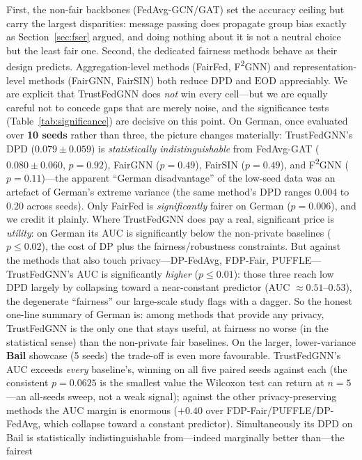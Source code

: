 \documentclass[pdflatex,sn-mathphys-num]{sn-jnl}
\theoremstyle{thmstyleone}%
\theoremstyle{thmstyletwo}%
\theoremstyle{thmstylethree}%
\newcommand{\dpd}{\mathrm{DPD}}
\newcommand{\eod}{\mathrm{EOD}}
\begin{document}
First, the non-fair backbones (FedAvg-GCN/GAT) set the accuracy ceiling but
carry the largest disparities: message passing does propagate group bias exactly
as Section~\ref{sec:fser} argued, and doing nothing about it is not a neutral
choice but the least fair one. Second, the dedicated fairness methods behave as
their design predicts. Aggregation-level methods (FairFed, F\textsuperscript{2}GNN)
and representation-level methods (FairGNN, FairSIN) both reduce $\dpd$ and
$\eod$ appreciably. We are explicit that TrustFedGNN does \emph{not} win every
cell---but we are equally careful not to concede gaps that are merely noise, and
the significance tests (Table~\ref{tab:significance}) are decisive on this point.
On German, once evaluated over \textbf{10 seeds} rather than three, the picture
changes materially: TrustFedGNN's DPD ($0.079\!\pm\!0.059$) is
\emph{statistically indistinguishable} from FedAvg-GAT ($0.080\!\pm\!0.060$,
$p{=}0.92$), FairGNN ($p{=}0.49$), FairSIN ($p{=}0.49$), and F\textsuperscript{2}GNN
($p{=}0.11$)---the apparent ``German disadvantage'' of the low-seed data was an
artefact of German's extreme variance (the same method's DPD ranges $0.004$ to
$0.20$ across seeds). Only FairFed is \emph{significantly} fairer on German
($p{=}0.006$), and we credit it plainly. Where TrustFedGNN does pay a real,
significant price is \emph{utility}: on German its AUC is significantly below the
non-private baselines ($p{\le}0.02$), the cost of DP plus the fairness/robustness
constraints. But against the methods that also touch privacy---DP-FedAvg,
FDP-Fair, PUFFLE---TrustFedGNN's AUC is significantly \emph{higher} ($p{\le}0.01$):
those three reach low DPD largely by collapsing toward a near-constant predictor
(AUC $\approx 0.51$--$0.53$), the degenerate ``fairness'' our large-scale study
flags with a dagger. So the honest one-line summary of German is: among methods
that provide any privacy, TrustFedGNN is the only one that stays useful, at
fairness no worse (in the statistical sense) than the non-private fair baselines.
On the larger, lower-variance \textbf{Bail} showcase (5 seeds) the trade-off is
even more favourable. TrustFedGNN's AUC exceeds \emph{every} baseline's, winning
on all five paired seeds against each (the consistent $p{=}0.0625$ is the
smallest value the Wilcoxon test can return at $n{=}5$---an all-seeds sweep, not
a weak signal); against the other privacy-preserving methods the AUC margin is
enormous ($+0.40$ over FDP-Fair/PUFFLE/DP-FedAvg, which collapse toward a
constant predictor). Simultaneously its DPD on Bail is statistically
indistinguishable from---indeed marginally better than---the fairest
\end{document}

